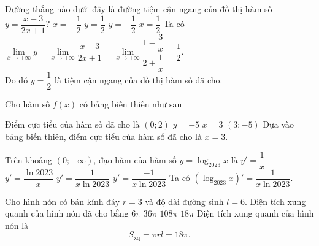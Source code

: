 \begin{ex}%
Đường thẳng nào dưới đây là đường tiệm cận ngang của đồ thị hàm số $y=\dfrac{x-3}{2x+1}$?
\choice 
{$x=-\dfrac{1}{2}$} 
{\True $y=\dfrac{1}{2}$}
{$y=-\dfrac{1}{2}$} 
{$x=\dfrac{1}{2}$}
\loigiai
{
Ta có $\lim\limits_{x\to +\infty }y=\lim\limits_{x\to +\infty }\dfrac{x-3}{2x+1}=\lim\limits_{x\to +\infty }\dfrac{1-\dfrac{3}{x}}{2+\dfrac{1}{x}}=\dfrac{1}{2}$.\\
Do đó $y=\dfrac{1}{2}$ là tiệm cận ngang của đồ thị hàm số đã cho.
}
\end{ex}

\begin{ex}%
Cho hàm số $f(x)$ có bảng biến thiên như sau
\begin{center}
\end{center}
Điểm cực tiểu của hàm số đã cho là
\choice 
{$(0;2)$} 
{$y=-5$}
{\True $x=3$} 
{$(3;-5)$}
\loigiai
{
Dựa vào bảng biến thiên, điểm cực tiểu của hàm số đã cho là $x=3$.
}
\end{ex}

\begin{ex}%
Trên khoảng $(0;+\infty )$, đạo hàm của hàm số $y=\log_{2023}x$ là
\choice 
{$y'=\dfrac{1}{x}$} 
{$y'=\dfrac{\ln 2023}{x}$}
{\True $y'=\dfrac{1}{x\ln 2023}$} 
{$y'=\dfrac{-1}{x\ln 2023}$}
\loigiai
{
Ta có $\left (\log_{2023}x \right )'=\dfrac{1}{x\ln 2023}$.
}
\end{ex}

\begin{ex}%
Cho hình nón có bán kính đáy $r=3$ và độ dài đường sinh $l=6$. Diện tích xung quanh của hình nón đã cho bằng
\choice 
{$6\pi$} 
{$36\pi$}
{$108\pi$} 
{\True $18\pi$}
\loigiai
{
Diện tích xung quanh của hình nón là $$S_{\text{xq}}=\pi rl=18\pi.$$
}
\end{ex}

